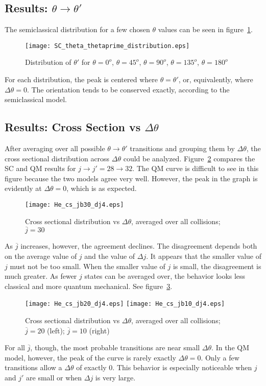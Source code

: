 \documentclass[letterpaper,titlepage,12pt]{article}
\begin{document}
\subsection{Results: $\theta\rightarrow \theta'$}
The semiclassical distribution for a few chosen $\theta$ values can be seen in
figure~\ref{fig:SC_t_tp}.
\begin{figure}[ht!]
    \centering
    \texttt{[image: SC\_theta\_thetaprime\_distribution.eps]}
    \caption{Distribution of $\theta'$ for $\theta=0^o$, $\theta=45^o$, $\theta=90^o$, $\theta=135^o$, $\theta=180^o$}
\label{fig:SC_t_tp}
\end{figure}
\newline For each distribution, the peak is centered where $\theta=\theta'$,
or, equivalently, where $\Delta\theta=0$.  The orientation tends to be
conserved exactly, according to the semiclassical model.

\subsection{Results: Cross Section vs $\Delta\theta$} After averaging over all
possible $\theta\rightarrow\theta'$ transitions and grouping them by
$\Delta\theta$, the cross sectional distribution across $\Delta\theta$ could be
analyzed.  Figure~\ref{fig:He_cs_jb30} compares the SC and QM results for
$j\rightarrow j'=28\rightarrow 32$.  The QM curve is difficult to see in this
figure because the two models agree very well.  However, the peak in the graph
is evidently at $\Delta\theta=0$, which is as expected.
\begin{figure}[ht!]
    \centering
    \texttt{[image: He\_cs\_jb30\_dj4.eps]}
    \caption{Cross sectional distribution vs $\Delta\theta$, averaged over all collisions; $\overline j=30$}
\label{fig:He_cs_jb30}
\end{figure}

As $\overline j$ increases, however, the agreement declines. The disagreement
depends both on the average value of $j$ and the value of $\Delta j$. It
appears that the smaller value of $j$ must not be too small.  When the smaller
value of $j$ is small, the disagreement is much greater.  As fewer $j$ states
can be averaged over, the behavior looks less classical and more quantum
mechanical.  See figure~\ref{fig:He_cs_jb20_10}.
\begin{figure}[ht!]
    \centering
    \texttt{[image: He\_cs\_jb20\_dj4.eps]}
    \texttt{[image: He\_cs\_jb10\_dj4.eps]}
    \caption{Cross sectional distribution vs $\Delta\theta$, averaged over all collisions; $\overline j = 20$ (left); $\overline j = 10$ (right)}
\label{fig:He_cs_jb20_10}
\end{figure}
For all $\overline j$, though, the most probable transitions are near small
$\Delta\theta$.  In the QM model, however, the peak of the curve is rarely exactly
$\Delta\theta=0$.  Only a few transitions allow a $\Delta\theta$ of exactly 0.
This behavior is especially noticeable when $j$ and $j'$ are small or when
$\Delta j$ is very large.
\end{document}
